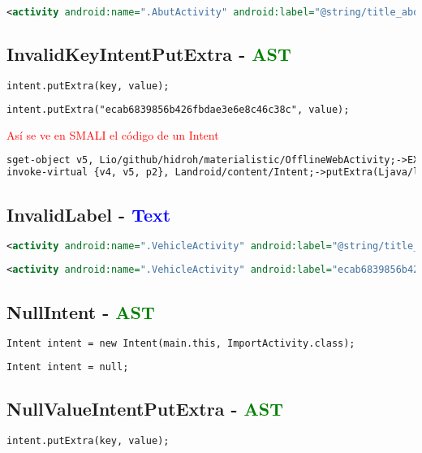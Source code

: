  \begin{lstlisting}[language=XML]
<activity android:name=".AbutActivity" android:label="@string/title_about" /> 
\end{lstlisting}
\subsection{InvalidKeyIntentPutExtra - \textcolor{green}{AST}}
\begin{lstlisting}[language=XML]
intent.putExtra(key, value); 
\end{lstlisting}

\begin{lstlisting}[language=XML]
intent.putExtra("ecab6839856b426fbdae3e6e8c46c38c", value);
\end{lstlisting}

\textcolor{red}{Así se ve en SMALI el código de un Intent}
\begin{lstlisting}[language=XML]
sget-object v5, Lio/github/hidroh/materialistic/OfflineWebActivity;->EXTRA_URL:Ljava/lang/String;
invoke-virtual {v4, v5, p2}, Landroid/content/Intent;->putExtra(Ljava/lang/String;Ljava/lang/String;)Landroid/content/Intent;
\end{lstlisting}
\subsection{InvalidLabel - \textcolor{blue}{Text}}
\begin{lstlisting}[language=XML]
<activity android:name=".VehicleActivity" android:label="@string/title_vehicle" /> 
\end{lstlisting}

\begin{lstlisting}[language=XML]
<activity android:name=".VehicleActivity" android:label="ecab6839856b426fbdae3e6e8c46c38c" /> 
\end{lstlisting}
\subsection{NullIntent - \textcolor{green}{AST}}
\begin{lstlisting}[language=XML]
Intent intent = new Intent(main.this, ImportActivity.class);
\end{lstlisting}

 \begin{lstlisting}[language=XML]
Intent intent = null;
\end{lstlisting}
\subsection{NullValueIntentPutExtra - \textcolor{green}{AST}}
\begin{lstlisting}[language=XML]
intent.putExtra(key, value);
\end{lstlisting}

